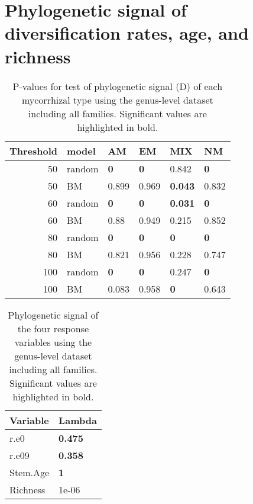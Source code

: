 \documentclass[]{article}
\begin{document}
\hypertarget{phylogenetic-signal-of-diversification-rates-age-and-richness}{%
\section{Phylogenetic signal of diversification rates, age, and
richness}\label{phylogenetic-signal-of-diversification-rates-age-and-richness}}

\begin{table}[H]

\caption{\label{tab:unnamed-chunk-37}P-values for test of phylogenetic signal (D) of each mycorrhizal type using the genus-level dataset including all families. Significant values are highlighted in bold.}
\centering
\begin{tabular}{r|l|l|l|l|l}
\hline
Threshold & model & AM & EM & MIX & NM\\
\hline
50 & random & \textbf{0} & \textbf{0} & 0.842 & \textbf{0}\\
\hline
50 & BM & 0.899 & 0.969 & \textbf{0.043} & 0.832\\
\hline
60 & random & \textbf{0} & \textbf{0} & \textbf{0.031} & \textbf{0}\\
\hline
60 & BM & 0.88 & 0.949 & 0.215 & 0.852\\
\hline
80 & random & \textbf{0} & \textbf{0} & \textbf{0} & \textbf{0}\\
\hline
80 & BM & 0.821 & 0.956 & 0.228 & 0.747\\
\hline
100 & random & \textbf{0} & \textbf{0} & 0.247 & \textbf{0}\\
\hline
100 & BM & 0.083 & 0.958 & \textbf{0} & 0.643\\
\hline
\end{tabular}
\end{table}

\begin{table}[H]

\caption{\label{tab:unnamed-chunk-38}Phylogenetic signal of the four response variables using the genus-level dataset including all families. Significant values are highlighted in bold.}
\centering
\begin{tabular}{l|l}
\hline
Variable & Lambda\\
\hline
r.e0 & \textbf{0.475}\\
\hline
r.e09 & \textbf{0.358}\\
\hline
Stem.Age & \textbf{1}\\
\hline
Richness & 1e-06\\
\hline
\end{tabular}
\end{table}
\end{document}
